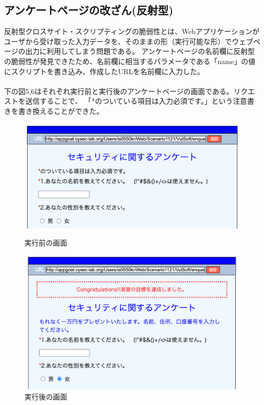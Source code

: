 \documentclass[dvipdfmx,autodetect-engine,titlepage]{jsarticle}
\begin{document}
\subsection{アンケートページの改ざん(反射型)}
反射型クロスサイト・スクリプティングの脆弱性とは、Webアプリケーションがユーザから受け取った入力データを、そのままの形（実行可能な形）でウェブページの出力に利用してしまう問題である。
アンケートページの名前欄に反射型の脆弱性が発見できたため、名前欄に相当するパラメータである「name」の値にスクリプトを書き込み、作成したURLを名前欄に入力した。\\\\
下の図5,6はそれぞれ実行前と実行後のアンケートページの画面である。リクエストを送信することで、
「*のついている項目は入力必須です。」という注意書きを書き換えることができた。\\
\begin{figure}[H]
  \centering
  \begin{minipage}[b]{0.45\linewidth}
  \begin{center}
    \includegraphics[keepaspectratio,scale=0.33]{web5.png}
    \end{center}
    \caption{実行前の画面}
  \end{minipage}
  \begin{minipage}[b]{0.45\linewidth}
  \begin{center}
    \includegraphics[keepaspectratio,scale=0.3]{web6.png}
    \end{center}
    \caption{実行後の画面}
  \end{minipage}
\end{figure}
\end{document}
